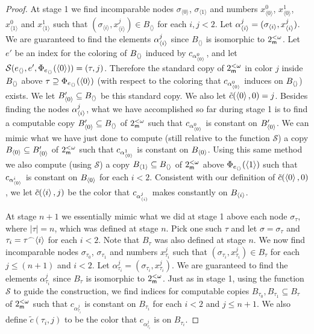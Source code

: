 \begin{proof}
At stage 1 we find incomparable nodes $\sigma_{\langle 0\rangle}$, $\sigma_{\langle 1\rangle}$
and numbers $x^0_{\langle 0\rangle}$, $x^1_{\langle 0\rangle}$, $x^0_{\langle 1\rangle}$
and $x^1_{\langle 1\rangle}$ such that
$(\sigma_{\langle i\rangle},x^j_{\langle i\rangle})\in B_{\langle \rangle}$
for each $i,j<2$.
Let $\alpha^j_{\left\langle i\right\rangle}=(\sigma_{\langle i\rangle},x^j_{\left\langle i\right\rangle})$.
We are guaranteed to find the elements $\alpha^j_{\left\langle i\right\rangle}$ since $B_{\langle \rangle}$
is isomorphic to $2^{<\omega}_{\mathsf{m}}$.
Let $e'$ be an index for the coloring of $B_{\left\langle \right\rangle}$ induced by $c_{\alpha^0_{\left\langle 0\right\rangle}}$,
and let $\mathcal{S}(e_{\left\langle \right\rangle},e',\Phi_{e_{\left\langle \right\rangle}}(\left\langle 0\right\rangle))=(\tau,j)$.
Therefore the standard copy of $2^{<\omega}_{\mathsf{m}}$ in color $j$ inside $B_{\left\langle \right\rangle}$ above
$\tau\supseteq\Phi_{e_{\left\langle \right\rangle}}(\left\langle 0\right\rangle)$
(with respect to the coloring that $c_{\alpha^0_{\left\langle 0\right\rangle}}$ induces on $B_{\left\langle \right\rangle}$) exists.
We let $B_{\langle 0\rangle}'\subseteq B_{\left\langle \right\rangle}$ be this standard copy.
We also let $\tilde{c}(\left\langle 0\right\rangle,0)=j$.
Besides finding the nodes $\alpha^j_{\left\langle i\right\rangle}$,
what we have accomplished so far during stage 1 is to
find a computable copy $B_{\left\langle 0\right\rangle}'\subseteq B_{\left\langle \right\rangle}$ of $2^{<\omega}_{\mathsf{m}}$
such that $c_{\alpha^0_{\left\langle 0\right\rangle}}$ is constant on $B_{\left\langle 0\right\rangle}'$.
We can mimic what we have just done to compute
(still relative to the function $\mathcal{S}$)
a copy $B_{\left\langle 0\right\rangle}\subseteq B_{\left\langle 0\right\rangle}'$ of $2^{<\omega}_{\mathsf{m}}$ such that
$c_{\alpha^1_{\left\langle 0\right\rangle}}$ is constant on $B_{\left\langle 0\right\rangle}$.
Using this same method we also compute (using $\mathcal{S}$)
a copy $B_{\left\langle 1\right\rangle}\subseteq B_{\left\langle \right\rangle}$ of $2^{<\omega}_{\mathsf{m}}$ above $\Phi_{e_{\left\langle \right\rangle}}(\left\langle 1\right\rangle)$
such that $c_{\alpha^i_{\left\langle 0\right\rangle}}$ is constant on $B_{\left\langle 0\right\rangle}$ for each $i<2$.
Consistent with our definition of $\tilde{c}(\left\langle 0\right\rangle,0)$,
we let $\tilde{c}(\left\langle i\right\rangle,j)$ be the color that
$c_{\alpha^j_{\left\langle i\right\rangle}}$ makes constantly on $B_{\left\langle i\right\rangle}$.

At stage $n+1$ we essentially mimic what we did at stage 1 above each node
$\sigma_{\tau}$, where $|\tau|=n$, which was defined at stage $n$.
Pick one such $\tau$ and let $\sigma=\sigma_\tau$ and
$\tau_i=\tau{}^\frown{\left\langle i\right\rangle}$ for each $i<2$.
Note that $B_{\tau}$ was also defined at stage $n$.
We now find incomparable nodes $\sigma_{\tau_0}$, $\sigma_{\tau_1}$
and numbers $x^j_{\tau_i}$ such that
$(\sigma_{\tau_i},x^j_{\tau_i})\in B_{\tau}$
for each $j\leq (n+1)$ and $i<2$.
Let $\alpha^j_{\tau_i}=(\sigma_{\tau_i},x^j_{\tau_i})$.
We are guaranteed to find the elements $\alpha^j_{\tau_i}$ since $B_{\tau}$
is isomorphic to $2^{<\omega}_{\mathsf{m}}$.
Just as in stage 1, using the function $\mathcal{S}$
to guide the construction,
we find indices for computable copies
$B_{\tau_0},B_{\tau_1}\subseteq B_{\tau}$
of $2^{<\omega}_{\mathsf{m}}$ such that $c_{\alpha^j_{\tau_i}}$ is constant on
$B_{\tau_i}$ for each $i<2$ and $j\leq{n+1}$.
We also define $\tilde{c}(\tau_i,j)$ to be the color
that $c_{\alpha^j_{\tau_i}}$ is on $B_{\tau_i}$.


\end{proof}
